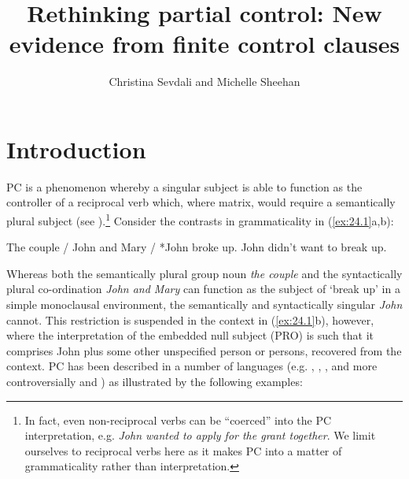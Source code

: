 \documentclass[output=paper]{langsci/langscibook}
\author{Christina Sevdali\affiliation{Ulster University} and Michelle Sheehan\affiliation{Anglia Ruskin University}}
\title{Rethinking partial control: New evidence from finite control clauses}
\begin{document}
\glsresetall
\renewcommand{\lsChapterFooterSize}{\footnotesize}
\maketitle

\section{Introduction}\label{sec:24.1}

\Gls{PC} is a
phenomenon whereby a singular subject is able to function as the controller of
a reciprocal verb which, where matrix, would require a semantically plural
subject (see \citealt{Landau2000}).\footnote{In fact, even non-reciprocal verbs
    can be “coerced” into the \gls{PC}
    interpretation, e.g. \textit{John wanted to apply for the grant together}. We limit
    ourselves to reciprocal verbs here as it makes \gls{PC} into a matter of grammaticality rather than interpretation.} Consider
the contrasts in grammaticality in (\ref{ex:24.1}a,b):\largerpage

\ea\label{ex:24.1}
	\ea The couple / John and Mary / *John broke up.
	\ex John didn’t want to break up.
	\z
\z

Whereas both the semantically plural group noun \emph{the couple} and the
syntactically plural co-ordination \emph{John and Mary} can function as the
subject of ‘break up’ in a simple monoclausal environment, the semantically and
syntactically singular \emph{John} cannot. This restriction is suspended in
the  context in (\ref{ex:24.1}b), however, where the interpretation of the embedded
null subject (PRO) is such that it comprises John plus some other unspecified
person or persons, recovered from the context. \gls{PC} has been described in a number of languages (e.g. ,
, ,  and more
controversially  and ) as
illustrated by the following examples:
\end{document}
